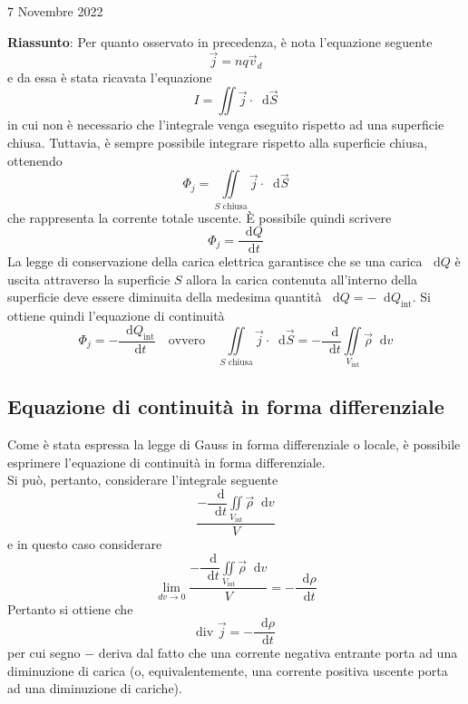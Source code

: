 \documentclass[a4paper]{extarticle}
\newcommand\dif{\mathop{}\!\mathrm{d}}
\begin{document}
\newpage
\noindent
\begin{center}
  7 Novembre 2022
\end{center}
\textbf{Riassunto}: Per quanto osservato in precedenza, è nota l'equazione seguente
\[\vec{j} = nq \vec{v}_d\]
e da essa è stata ricavata l'equazione
\[I = \iint \vec j \cdot \dif \vec S\]
in cui non è necessario che l'integrale venga eseguito rispetto ad una superficie chiusa. Tuttavia, è sempre possibile integrare rispetto alla superficie chiusa, ottenendo
\[\Phi_j = \underset{S \text{ chiusa}}{\iint} \vec j \cdot \dif \vec S\]
che rappresenta la corrente totale uscente. È possibile quindi scrivere
\[\Phi_j = \dfrac{\dif Q}{\dif t}\]
La legge di conservazione della carica elettrica garantisce che se una carica $\dif Q$ è uscita attraverso la superficie $S$ allora la carica contenuta all'interno della superficie deve essere diminuita della medesima quantità $\dif Q = -\dif Q_{\text{int}}$. Si ottiene quindi l'equazione di continuità
\[\Phi_j = - \dfrac{\dif Q_{\text{int}}}{\dif t} \hspace{1em} \text{ovvero} \hspace{1em} \underset{S \text{ chiusa}}{\iint} \vec j \cdot \dif \vec S = - \dfrac{\dif}{\dif t} \underset{V_\text{int}}{\iint} \vec \rho \dif v\]

\vspace{1em}
\noindent
\subsection{Equazione di continuità in forma differenziale}
Come è stata espressa la legge di Gauss in forma differenziale o locale, è possibile esprimere l'equazione di continuità in forma differenziale.\\
Si può, pertanto, considerare l'integrale seguente 
\[\dfrac{-\dfrac{\dif}{\dif t} \underset{V_\text{int}}{\iint} \vec \rho \dif v}{V}\]
e in questo caso considerare
\[\lim_{dv \to 0} \dfrac{-\dfrac{\dif}{\dif t} \underset{V_\text{int}}{\iint} \vec \rho \dif v}{V} = - \dfrac{\dif \rho}{\dif t}\]
Pertanto si ottiene che
\[\boxed{\text{div } \vec j = - \dfrac{\dif \rho}{\dif t}}\]
per cui segno $-$ deriva dal fatto che una corrente negativa entrante porta ad una diminuzione di carica (o, equivalentemente, una corrente positiva uscente porta ad una diminuzione di cariche).

\vspace{1em}
\end{document}
